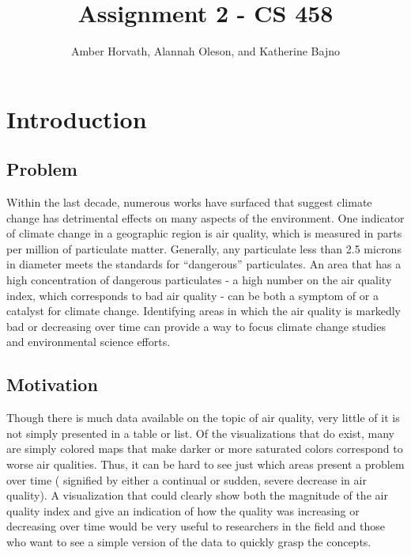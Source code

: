 \documentclass[journal]{vgtc}                %
\title{Assignment 2 - CS 458}
\author{Amber Horvath, Alannah Oleson, and Katherine Bajno}
\begin{document}


\maketitle

\section{Introduction} %

\subsection{Problem}
Within the last decade, numerous works have surfaced that suggest climate change has detrimental effects on many 
aspects of the environment. One indicator of climate change in a geographic region is air quality, which is measured 
in parts per million of particulate matter. Generally, any particulate less than 2.5 microns in diameter meets the 
standards for “dangerous” particulates. An area that has a high concentration of dangerous particulates - a high 
number on the air quality index, which corresponds to bad air quality - can be both a symptom of or a catalyst for 
climate change. Identifying areas in which the air quality is markedly bad or decreasing over time can provide a way 
to focus climate change studies and environmental science efforts.

\subsection{Motivation}
Though there is much data available on the topic of air quality, very little of it is not simply presented in a table 
or list. Of the visualizations that do exist, many are simply colored maps that make darker or more saturated colors 
correspond to worse air qualities. Thus, it can be hard to see just which areas present a problem over time (
signified by either a continual or sudden, severe decrease in air quality). A visualization that could clearly show 
both the magnitude of the air quality index and give an indication of how the quality was increasing or decreasing 
over time would be very useful to researchers in the field and those who want to see a simple version of the data
to quickly grasp the concepts.
\end{document}

